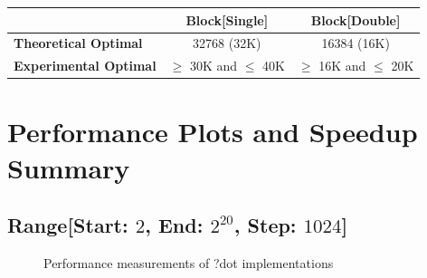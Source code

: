 \begin{table}[ht]
    \centering
    \begin{tabular}{l|c|c|}
        & \textbf{Block[Single]} & \textbf{Block[Double]}\\
        \hline
        \textbf{Theoretical Optimal} & 32768 (32K) & 16384 (16K)\\
        \hline
        \textbf{Experimental Optimal} & $\geq$ 30K and $\leq$ 40K & $\geq$ 16K and $\leq$ 20K\\
        \hline
    \end{tabular}
\end{table}

\clearpage
\section{Performance Plots and Speedup Summary}

\subsection{Range[Start: $2$, End: $2^{20}$, Step: $1024$]}

\begin{figure}[htb]
    \centering
    \caption*{Performance measurements of ?dot implementations}
    \label{fig:dot_Sgflop220}
    \qquad
    \label{fig:dot_Dgflop220}
\end{figure}

